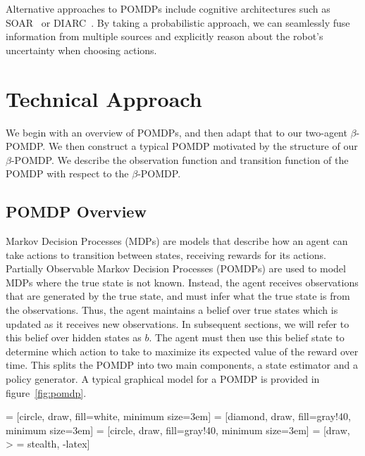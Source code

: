 \documentclass[conference]{IEEEtran}
\begin{document}
Alternative approaches to
POMDPs include cognitive architectures such as SOAR~\citep{soar} or
DIARC~\citep{diarc}.  By taking a probabilistic approach, we can seamlessly
fuse information from multiple sources and explicitly reason about the
robot's uncertainty when choosing actions.

\section{Technical Approach}

We begin with an overview of POMDPs, and then adapt that to our two-agent $\beta$-POMDP. We then construct a typical POMDP motivated by the structure of our $\beta$-POMDP. We describe the observation function and transition function of the POMDP with respect to the $\beta$-POMDP. 

\subsection{POMDP Overview}

Markov Decision Processes (MDPs) are models that describe how an agent can take actions to transition between states, receiving rewards for its actions. Partially Observable Markov Decision Processes (POMDPs) are used to model MDPs where the true state is not known. Instead, the agent receives observations that are generated by the true state, and must infer what the true state is from the observations. Thus, the agent maintains a belief over true states which is updated as it receives new observations. In subsequent sections, we will refer to this belief over hidden states as $b$. The agent must then use this belief state to determine which action to take to maximize its expected value of the reward over time. This splits the POMDP into two main components, a state estimator and a policy generator. A typical graphical model for a POMDP is provided in figure~\ref{fig:pomdp}.

 = [circle, draw, fill=white, minimum size=3em]
 = [diamond, draw, fill=gray!40, minimum size=3em]
 = [circle, draw, fill=gray!40, minimum size=3em]
 = [draw, > = stealth, -latex]
\end{document}
